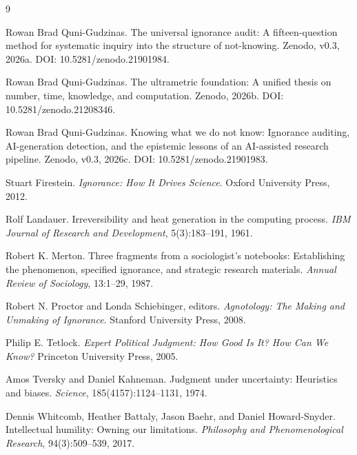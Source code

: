\documentclass{article}
\begin{document}

\begin{thebibliography}{9}

Rowan Brad Quni-Gudzinas.
\newblock The universal ignorance audit: A fifteen-question method for systematic inquiry into the structure of not-knowing.
\newblock Zenodo, v0.3, 2026a.
\newblock DOI: 10.5281/zenodo.21901984.

Rowan Brad Quni-Gudzinas.
\newblock The ultrametric foundation: A unified thesis on number, time, knowledge, and computation.
\newblock Zenodo, 2026b.
\newblock DOI: 10.5281/zenodo.21208346.

Rowan Brad Quni-Gudzinas.
\newblock Knowing what we do not know: Ignorance auditing, AI-generation detection, and the epistemic lessons of an AI-assisted research pipeline.
\newblock Zenodo, v0.3, 2026c.
\newblock DOI: 10.5281/zenodo.21901983.

Stuart Firestein.
\newblock \emph{Ignorance: How It Drives Science}.
\newblock Oxford University Press, 2012.

Rolf Landauer.
\newblock Irreversibility and heat generation in the computing process.
\newblock \emph{IBM Journal of Research and Development}, 5(3):183--191, 1961.

Robert K. Merton.
\newblock Three fragments from a sociologist's notebooks: Establishing the phenomenon, specified ignorance, and strategic research materials.
\newblock \emph{Annual Review of Sociology}, 13:1--29, 1987.

Robert N. Proctor and Londa Schiebinger, editors.
\newblock \emph{Agnotology: The Making and Unmaking of Ignorance}.
\newblock Stanford University Press, 2008.

Philip E. Tetlock.
\newblock \emph{Expert Political Judgment: How Good Is It? How Can We Know?}
\newblock Princeton University Press, 2005.

Amos Tversky and Daniel Kahneman.
\newblock Judgment under uncertainty: Heuristics and biases.
\newblock \emph{Science}, 185(4157):1124--1131, 1974.

Dennis Whitcomb, Heather Battaly, Jason Baehr, and Daniel Howard-Snyder.
\newblock Intellectual humility: Owning our limitations.
\newblock \emph{Philosophy and Phenomenological Research}, 94(3):509--539, 2017.

\end{thebibliography}
\end{document}
